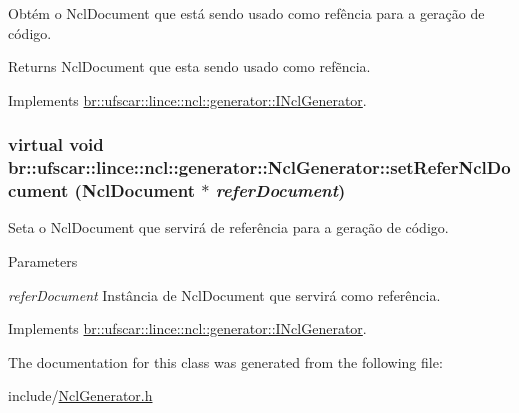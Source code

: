 Obtém o NclDocument que está sendo usado como refência para a geração de código. 

\begin{DoxyReturn}{Returns}
NclDocument que esta sendo usado como refẽncia. 
\end{DoxyReturn}


Implements \hyperlink{classbr_1_1ufscar_1_1lince_1_1ncl_1_1generator_1_1INclGenerator_ae351bae817561b66e20e5442d49a17e0}{br::ufscar::lince::ncl::generator::INclGenerator}.

\hypertarget{classbr_1_1ufscar_1_1lince_1_1ncl_1_1generator_1_1NclGenerator_aad4936354267258229fb526a070e5482}{
\subsubsection[{setReferNclDocument}]{\setlength{\rightskip}{0pt plus 5cm}virtual void br::ufscar::lince::ncl::generator::NclGenerator::setReferNclDocument (NclDocument $\ast$ {\em referDocument})}}
\label{classbr_1_1ufscar_1_1lince_1_1ncl_1_1generator_1_1NclGenerator_aad4936354267258229fb526a070e5482}


Seta o NclDocument que servirá de referência para a geração de código. 


\begin{DoxyParams}{Parameters}
\item[{\em referDocument}]Instância de NclDocument que servirá como referência. \end{DoxyParams}


Implements \hyperlink{classbr_1_1ufscar_1_1lince_1_1ncl_1_1generator_1_1INclGenerator_aa6efc869c5838051c86741ce73babe4e}{br::ufscar::lince::ncl::generator::INclGenerator}.



The documentation for this class was generated from the following file:\begin{DoxyCompactItemize}
\item 
include/\hyperlink{NclGenerator_8h}{NclGenerator.h}\end{DoxyCompactItemize}
